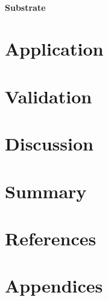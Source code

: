 \documentclass[
]{book}
\begin{document}
\hypertarget{substrate-11}{%
\subsubsection{Substrate}\label{substrate-11}}

\hypertarget{application}{%
\chapter{Application}\label{application}}

\hypertarget{validation}{%
\chapter{Validation}\label{validation}}

\hypertarget{discussion}{%
\chapter{Discussion}\label{discussion}}

\hypertarget{summary}{%
\chapter{Summary}\label{summary}}

\hypertarget{references}{%
\chapter*{References}\label{references}}

\hypertarget{appendices}{%
\chapter*{Appendices}\label{appendices}}
\end{document}
